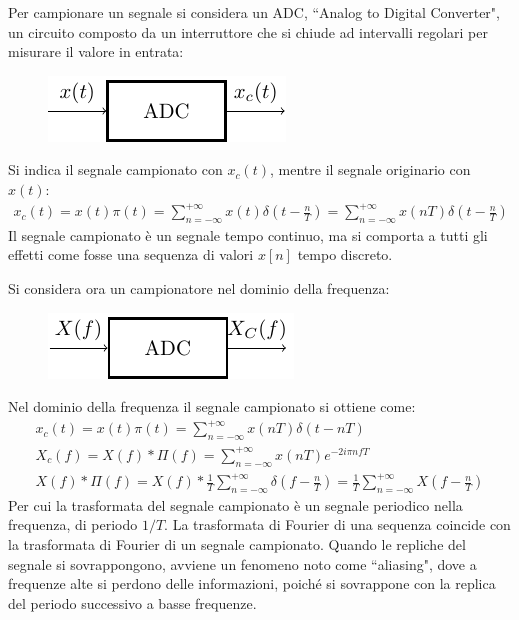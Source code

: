 \documentclass{article}
\numberwithin{equation}{subsection}
\begin{document}
Per campionare un segnale si considera un ADC, ``Analog to Digital Converter", un circuito composto da un interruttore che si chiude ad intervalli regolari per misurare il 
valore in entrata: 
\begin{figure}[H]%
    \centering
    \includegraphics{adc.pdf}%
\end{figure}
Si indica il segnale campionato con $x_c(t)$, mentre il segnale originario con $x(t)$:
\begin{gather*}
    x_c(t)=x(t)\pi(t)=\displaystyle\sum_{n=-\infty}^{+\infty}x(t)\delta\left(t-\frac{n}{T}\right)=\sum_{n=-\infty}^{+\infty}x(nT)\delta\left(t-\frac{n}{T}\right)
\end{gather*}
Il segnale campionato è un segnale tempo continuo, ma si comporta a tutti gli effetti come fosse una sequenza di valori $x[n]$ tempo discreto. 

Si considera ora un campionatore nel dominio della frequenza:
\begin{figure}[H]%
    \centering
    \includegraphics{adc-fourier.pdf}%
\end{figure}

Nel dominio della frequenza il segnale campionato si ottiene come:
\begin{gather*}
    x_c(t)=x(t)\pi(t)=\displaystyle\sum_{n=-\infty}^{+\infty}x(nT)\delta\left(t-nT\right)\\
    X_c(f)=X(f)*\Pi(f)=\displaystyle\sum_{n=-\infty}^{+\infty}x(nT)e^{-2i\pi nfT}\\
    X(f)*\Pi(f)=\displaystyle X(f)*\frac{1}{T}\sum_{n=-\infty}^{+\infty}\delta\left(f-\frac{n}{T}\right)=\frac{1}{T}\sum_{n=-\infty}^{+\infty}X\left(f-\frac{n}{T}\right)
\end{gather*}
Per cui la trasformata del segnale campionato è un segnale periodico nella frequenza, di periodo $1/T$. 
La trasformata di Fourier di una sequenza coincide con la trasformata di Fourier di un segnale campionato. 
Quando le repliche del segnale si sovrappongono, avviene un fenomeno 
noto come ``aliasing", dove a frequenze alte si perdono delle informazioni, poiché si sovrappone con la replica del periodo successivo a basse frequenze. 
\end{document}
